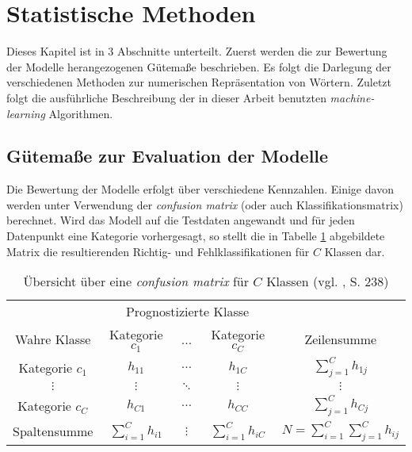 \documentclass[a4paper,11pt]{article}
\begin{document}
\section{Statistische Methoden}

Dieses Kapitel ist in $3$ Abschnitte unterteilt. Zuerst werden die zur Bewertung der Modelle herangezogenen Gütemaße beschrieben. Es folgt die Darlegung der verschiedenen Methoden zur numerischen Repräsentation von Wörtern. Zuletzt folgt die ausführliche Beschreibung der in dieser Arbeit benutzten \textit{machine-learning} Algorithmen.

\subsection{Gütemaße zur Evaluation der Modelle}\label{kap:guetemass}

Die Bewertung der Modelle erfolgt über verschiedene Kennzahlen. Einige davon werden unter Verwendung der \textit{confusion matrix} (oder auch Klassifikationsmatrix) berechnet. Wird das Modell auf die Testdaten angewandt und für jeden Datenpunkt eine Kategorie vorhergesagt, so stellt die in Tabelle \ref{tab:confusionMatrix} abgebildete Matrix die resultierenden Richtig- und Fehlklassifikationen für $C$ Klassen dar.

\begin{table}[ht]
\begin{center}
\begin{tabular}{|c|ccc|c|}
  \hline
 & \multicolumn{3}{|c|}{Prognostizierte Klasse} &  \\
Wahre Klasse & Kategorie $c_1$ & ...  & Kategorie $c_C$ & Zeilensumme  \\ 
  \hline
Kategorie $c_1$ & $h_{11}$ & $\hdots$ & $h_{1C}$ & $\sum_{j=1}^C h_{1j}$\\
$\vdots$ & $\vdots$ & $\ddots$ & $\vdots$ & $\vdots$ \\
Kategorie $c_C$ & $h_{C1}$ & $\hdots$ & $h_{CC}$ & $\sum_{j=1}^C h_{Cj}$\\
\hline
Spaltensumme & $\sum_{i=1}^C h_{i1}$ & $\vdots$ & $\sum_{i=1}^C h_{iC}$ & 
$N = \sum_{i=1}^C \sum_{j=1}^C h_{ij}$\\
   \hline
\end{tabular}

  \caption{Übersicht über eine \textit{confusion matrix}  für $C$  Klassen (vgl. \cite{backhaus}, S. 238)}  
  \label{tab:confusionMatrix}
\end{center}
\end{table}
\end{document}
